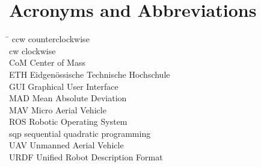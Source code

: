 
\section*{Acronyms and Abbreviations}
\begin{tabbing}
 \hspace*{1.6cm}  \= \kill
 ccw\> counterclockwise \\[0.5ex]
 cw\> clockwise \\[0.5ex]
 CoM \> Center of Mass \\[0.5ex]
 ETH \> Eidgenössische Technische Hochschule \\[0.5ex]
 GUI \> Graphical User Interface \\[0.5ex]
 MAD \> Mean Absolute Deviation \\[0.5ex]
 MAV \> Micro Aerial Vehicle \\[0.5ex]
 ROS \> Robotic Operating System \\[0.5ex]
 sqp \> sequential quadratic programming \\[0.5ex]
 UAV \> Unmanned Aerial Vehicle \\[0.5ex]
 URDF \> Unified Robot Description Format \\[0.5ex]
\end{tabbing}
